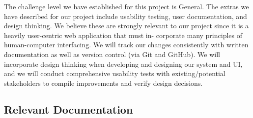 \documentclass[12pt, titlepage]{article}
\begin{document}
The challenge level we have established for this project is General.
The extras we have described for our project include usability testing, user
documentation, and design thinking. We believe these are strongly relevant
to our project since it is a heavily user-centric web application that must in-
corporate many principles of human-computer interfacing. We will track our
changes consistently with written documentation as well as version control (via
Git and GitHub). We will incorporate design thinking when developing and
designing our system and UI, and we will conduct comprehensive usability tests
with existing/potential stakeholders to compile improvements and verify design
decisions.



\subsection{Relevant Documentation}



\end{document}
